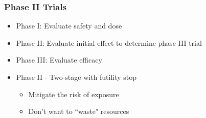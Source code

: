 \documentclass{beamer}\usepackage[]{graphicx}\usepackage[]{color}
\begin{document}
\begin{frame}
\frametitle{Phase II Trials}
    \begin{itemize}
        \item Phase I: Evaluate safety and dose
        \item Phase II: Evaluate initial effect to determine phase III trial
        \item Phase III: Evaluate efficacy  
    \end{itemize}
    \begin{itemize}
        \item Phase II - Two-stage with futility stop
          \begin{itemize}
            \item Mitigate the risk of exposure
            \item Don't want to ``waste" resources
          \end{itemize}
    \end{itemize}
\end{frame}
\end{document}

